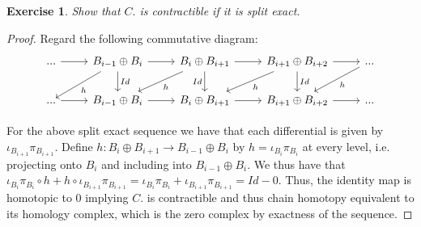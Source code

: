 \documentclass{article}
\newtheorem{exercise}{Exercise}
\begin{document}
\begin{exercise}
  Show that $C.$ is contractible if it is split exact.
\end{exercise}
\begin{proof}
  Regard the following commutative diagram:
  \[
    \begin{tikzcd}
... \arrow[r] & B_{i-1} \oplus B_{i} \arrow[r] \arrow[d, "Id"] \arrow[ld, "h"] & B_{i} \oplus B_{i+1} \arrow[r] \arrow[d, "Id"'] \arrow[ld, "h"] & B_{i+1} \oplus B_{i+2}  \arrow[d, "Id"] \arrow[ld, "h"] \arrow[r] & ... \arrow[ld, "h"] \\
... \arrow[r] & B_{i-1} \oplus B_{i}  \arrow[r]                                & B_{i} \oplus B_{i+1} \arrow[r]                                  & B_{i+1} \oplus B_{i+2} \arrow[r]                                  & ...                
\end{tikzcd}
\]

For the above split exact sequence we have that each differential is given by $\iota_{B_{i+1}}\pi_{B_{i+1}}$. Define $h: B_{i} \oplus B_{i+1} \to B_{i-1} \oplus B_{i}$ by $h = \iota_{B_{i}}\pi_{B_{i}}$ at every level, i.e. projecting onto $B_{i}$ and including into $B_{i-1} \oplus B_{i}$. We thus have that $\iota_{B_{i}}\pi_{B_{i}} \circ h + h \circ \iota_{B_{i+1}}\pi_{B_{i+1}} = \iota_{B_{i}}\pi_{B_{i}} + \iota_{B_{i+1}}\pi_{B_{i+1}} = Id - 0$. Thus, the identity map is homotopic to 0 implying $C.$ is contractible and thus chain homotopy equivalent to its homology complex, which is the zero complex by exactness of the sequence. 
\end{proof}
\end{document}
